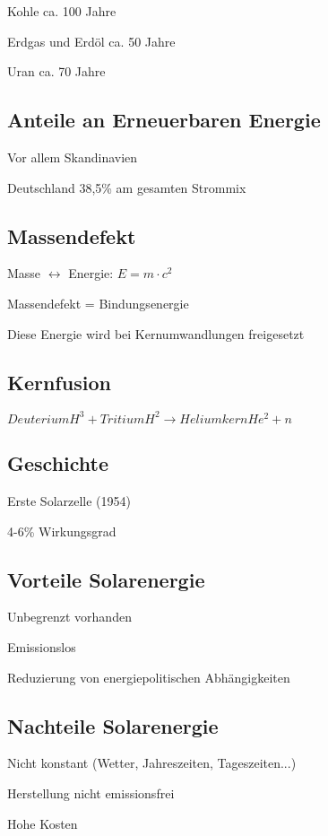 Kohle ca. 100 Jahre

Erdgas und Erdöl ca. 50 Jahre

Uran ca. 70 Jahre


\subsection{Anteile an Erneuerbaren Energie}

Vor allem Skandinavien

Deutschland 38,5\% am gesamten Strommix


\subsection{Massendefekt}

Masse $\leftrightarrow$ Energie: $E = m\cdot c^2$

Massendefekt = Bindungsenergie

Diese Energie wird bei Kernumwandlungen freigesetzt


\subsection{Kernfusion}

$Deuterium H^3 + Tritium H^2 \rightarrow Heliumkern He^2 + n$


\subsection{Geschichte}

Erste Solarzelle (1954)

4-6\% Wirkungsgrad


\subsection{Vorteile Solarenergie}

Unbegrenzt vorhanden

Emissionslos

Reduzierung von energiepolitischen Abhängigkeiten


\subsection{Nachteile Solarenergie}

Nicht konstant (Wetter, Jahreszeiten, Tageszeiten...)

Herstellung nicht emissionsfrei

Hohe Kosten


